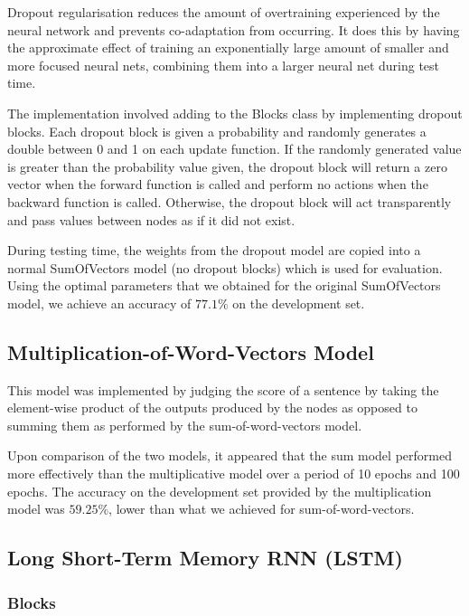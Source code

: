 \documentclass{article} %
\begin{document}
Dropout regularisation reduces the amount of overtraining experienced by the neural network and prevents co-adaptation  from occurring. It does this by having the approximate effect of training an exponentially large amount of smaller and more focused neural nets, combining them into a larger neural net during test time.

The implementation involved adding to the Blocks class by implementing dropout blocks. Each dropout block is given a probability and randomly generates a double between 0 and 1 on each update function. If the randomly generated value is greater than the probability value given, the dropout block will return a zero vector when the forward function is called and perform no actions when the backward function is called. Otherwise, the dropout block will act transparently and pass values between nodes as if it did not exist.

During testing time, the weights from the dropout model are copied into a normal SumOfVectors model (no dropout blocks) which is used for evaluation. Using the optimal parameters that we obtained for the original SumOfVectors model, we achieve an accuracy of $77.1\%$ on the development set.

\subsection{Multiplication-of-Word-Vectors Model}

This model was implemented by judging the score of a sentence by taking the element-wise product of the outputs produced by the nodes as opposed to summing them as performed by the sum-of-word-vectors model. 

Upon comparison of the two models, it appeared that the sum model performed more effectively than the multiplicative model over a period of 10 epochs and 100 epochs. The accuracy on the development set provided by the multiplication model was $59.25\%$, lower than what we achieved for sum-of-word-vectors.

\subsection{Long Short-Term Memory RNN (LSTM)}

\subsubsection{Blocks}
\end{document}
